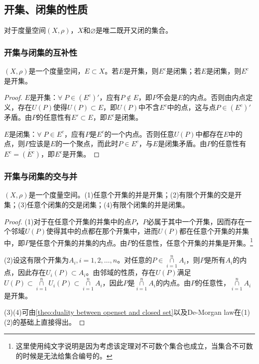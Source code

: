 \subsection*{开集、闭集的性质}
\begin{theorem}
	对于度量空间$(X,\rho)$，$X$和$\varnothing$是唯二既开又闭的集合。
\end{theorem}
\subsubsection{开集与闭集的互补性}
\begin{theorem}\label{theo:duality between openset and closed set}
	$(X,\rho)$是一个度量空间，$E\subset X$。若$E$是开集，则$E^c$是闭集；若$E$是闭集，则$E^c$是开集。
\end{theorem}
\begin{proof}
	$E$是开集：$\forall\; P\in (E^c)'$，应有$P\notin E$，即$P$不会是$E$的内点。否则由内点定义，存在$U(P)$使得$U(P)\subset E$，即$U(P)$中不含$E^c$中的点，这与点$P\in (E^c)'$矛盾。由$P$的任意性有$E'\subset E$，即$E^c$是闭集。\par
	$E$是闭集：$\forall\; P\in E^c$，应有$P$是$E^c$的一个内点。否则任意$U(P)$中都存在$E$中的点，则$P$应该是$E$的一个聚点，而此时$P\in E^c$，与$E$是闭集矛盾。由$P$的任意性有$E^c=\mathring{(E^c)}$，即$E^c$是开集。
\end{proof}
\subsubsection{开集与闭集的交与并}
\begin{theorem}\label{theo:CapAndCupOfOpenSetAndClosedSet}
	$(X,\rho)$是一个度量空间。(1)任意个开集的并是开集；(2)有限个开集的交是开集；(3)任意个闭集的交是闭集；(4)有限个闭集的并是闭集。
\end{theorem}
\begin{proof}
	(1)对于在任意个开集的并集中的点$P$，$P$必属于其中一个开集，因而存在一个邻域$U(P)$使得其中的点都在那个开集中，进而$U(P)$都在任意个开集的并集中，即$P$是任意个开集的并集的内点。由$P$的任意性，任意个开集的并集是开集。\footnote{这里使用纯文字说明是因为考虑该定理对不可数个集合也成立，当集合不可数的时候是无法给集合编号的。}\par
	(2)设这有限个开集为$A_i,i=1,2,\dots,n$。对任意的$ P\in\underset{i=1}{\overset{n}{\cap}}A_i$，则$P$是所有$A_i$的内点，因此存在$U_i(P)\subset A_i$。由邻域的性质，存在$U(P)$满足$U(P)\subset\underset{i=1}{\overset{n}{\cap}}U_i(P)\subset\underset{i=1}{\overset{n}{\cap}}A_i$，因此$P$是$\underset{i=1}{\overset{n}{\cap}}A_i$的内点。由$P$的任意性，$\underset{i=1}{\overset{n}{\cap}}A_i$是开集。\par
	(3)(4)可由\cref{theo:duality between openset and closed set}以及De-Morgan law在(1)(2)的基础上直接得出。
\end{proof}